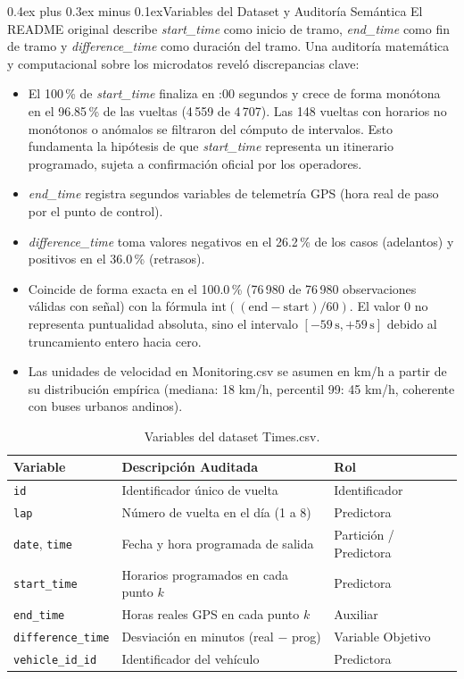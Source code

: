 \documentclass[conference]{IEEEtran}
\makeatletter
\def\subsection{\@startsection{subsection}{2}{\z@}{1.0ex plus 0.6ex minus 0.2ex}%
{0.4ex plus 0.3ex minus 0.1ex}{\normalfont\normalsize\bfseries\itshape}}
\makeatother
\begin{document}
\subsection{Variables del Dataset y Auditoría Semántica}
El README original describe \textit{start\_time} como inicio de tramo, \textit{end\_time} como fin de tramo y \textit{difference\_time} como duración del tramo. Una auditoría matemática y computacional sobre los microdatos reveló discrepancias clave:
\begin{itemize}
    \item El 100\,\% de \textit{start\_time} finaliza en :00 segundos y crece de forma monótona en el 96.85\,\% de las vueltas (4\,559 de 4\,707). Las 148 vueltas con horarios no monótonos o anómalos se filtraron del cómputo de intervalos. Esto fundamenta la hipótesis de que \textit{start\_time} representa un itinerario programado, sujeta a confirmación oficial por los operadores.
    \item \textit{end\_time} registra segundos variables de telemetría GPS (hora real de paso por el punto de control).
    \item \textit{difference\_time} toma valores negativos en el 26.2\,\% de los casos (adelantos) y positivos en el 36.0\,\% (retrasos).
    \item Coincide de forma exacta en el 100.0\,\% (76\,980 de 76\,980 observaciones válidas con señal) con la fórmula $\text{int}((\text{end} - \text{start}) / 60)$. El valor 0 no representa puntualidad absoluta, sino el intervalo $[-59\,\text{s}, +59\,\text{s}]$ debido al truncamiento entero hacia cero.
    \item Las unidades de velocidad en Monitoring.csv se asumen en km/h a partir de su distribución empírica (mediana: 18 km/h, percentil 99: 45 km/h, coherente con buses urbanos andinos).
\end{itemize}

\begin{table}[t]
\caption{Variables del dataset Times.csv.}
\label{tab:times}
\centering
\scriptsize
\begin{tabularx}{\columnwidth}{l X l}
\toprule
\textbf{Variable} & \textbf{Descripción Auditada} & \textbf{Rol} \\
\midrule
\texttt{id} & Identificador único de vuelta & Identificador \\
\texttt{lap} & Número de vuelta en el día (1 a 8) & Predictora \\
\texttt{date}, \texttt{time} & Fecha y hora programada de salida & Partición / Predictora \\
\texttt{start\_time} & Horarios programados en cada punto $k$ & Predictora \\
\texttt{end\_time} & Horas reales GPS en cada punto $k$ & Auxiliar \\
\texttt{difference\_time} & Desviación en minutos (real $-$ prog) & Variable Objetivo \\
\texttt{vehicle\_id\_id} & Identificador del vehículo & Predictora \\
\bottomrule
\end{tabularx}
\end{table}
\end{document}
